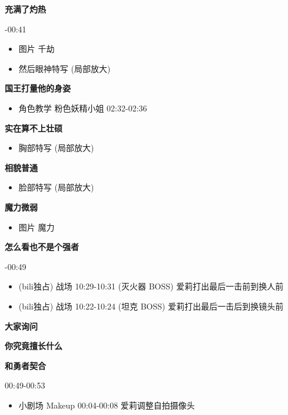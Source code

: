 \documentclass[a4paper]{article}
\begin{document}
\textbf{\color{red} 充满了灼热}

-00:41
 
\begin{itemize}
    \item 图片 千劫
    \item 然后眼神特写 (局部放大)
\end{itemize}

\textbf{国王打量他的身姿}

\begin{itemize}
    \item 角色教学 粉色妖精小姐 02:32-02:36
\end{itemize}

\textbf{实在算不上壮硕}

\begin{itemize}
    \item 胸部特写 (局部放大)
\end{itemize}

\textbf{相貌普通}

\begin{itemize}
    \item 脸部特写 (局部放大)
\end{itemize}

\textbf{魔力微弱}

\begin{itemize}
    \item 图片 魔力
\end{itemize}

\textbf{怎么看也不是个强者}

-00:49

\begin{itemize}
    \item (bili独占) 战场 10:29-10:31 (灭火器 BOSS) 爱莉打出最后一击前到换人前
    \item (bili独占) 战场 10:22-10:24 (坦克 BOSS) 爱莉打出最后一击后到换镜头前
\end{itemize}

\textbf{大家询问}

\textbf{你究竟擅长什么}

\textbf{和勇者契合}

00:49-00:53

\begin{itemize}
    \item 小剧场 Makeup 00:04-00:08 爱莉调整自拍摄像头
\end{itemize}
\end{document}

